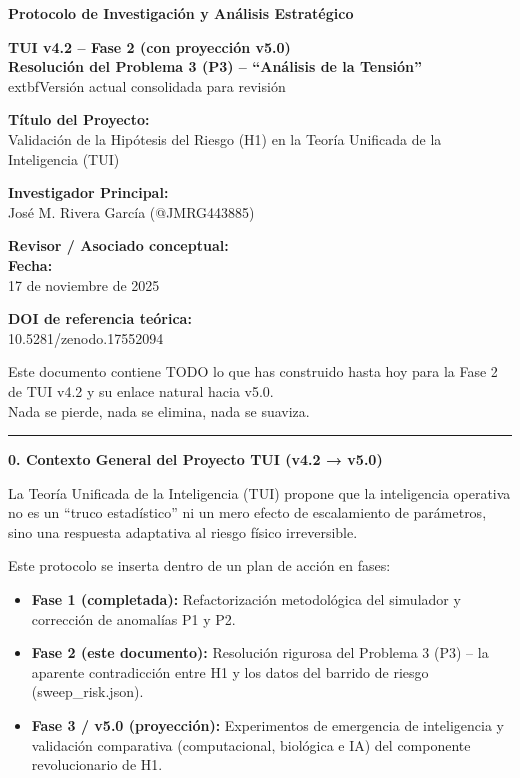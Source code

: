 \textbf{Protocolo de Investigación y Análisis Estratégico}

\textbf{TUI v4.2 -- Fase 2 (con proyección v5.0)}\\
\textbf{Resolución del Problema 3 (P3) -- ``Análisis de la Tensión''}\\
	extbf{Versión actual consolidada para revisión}

\textbf{Título del Proyecto:}\\
Validación de la Hipótesis del Riesgo (H1) en la Teoría Unificada de la
Inteligencia (TUI)

\textbf{Investigador Principal:}\\
José M. Rivera García (@JMRG443885)

\textbf{Revisor / Asociado conceptual:}\\


\textbf{Fecha:}\\
17 de noviembre de 2025

\textbf{DOI de referencia teórica:}\\
10.5281/zenodo.17552094

Este documento contiene TODO lo que has construido hasta hoy para la
Fase 2 de TUI v4.2 y su enlace natural hacia v5.0.\\
Nada se pierde, nada se elimina, nada se suaviza.

\begin{center}\rule{0.5\linewidth}{0.5pt}\end{center}

\textbf{0. Contexto General del Proyecto TUI (v4.2 → v5.0)}

La Teoría Unificada de la Inteligencia (TUI) propone que la inteligencia
operativa no es un ``truco estadístico'' ni un mero efecto de
escalamiento de parámetros, sino una respuesta adaptativa al riesgo
físico irreversible.

Este protocolo se inserta dentro de un plan de acción en fases:

\begin{itemize}
\item
  \textbf{Fase 1 (completada):} Refactorización metodológica del
  simulador y corrección de anomalías P1 y P2.
\item
  \textbf{Fase 2 (este documento):} Resolución rigurosa del Problema 3
  (P3) -- la aparente contradicción entre H1 y los datos del barrido de
  riesgo (sweep\_risk.json).
\item
  \textbf{Fase 3 / v5.0 (proyección):} Experimentos de emergencia de
  inteligencia y validación comparativa (computacional, biológica e IA)
  del componente revolucionario de H1.
\end{itemize}

